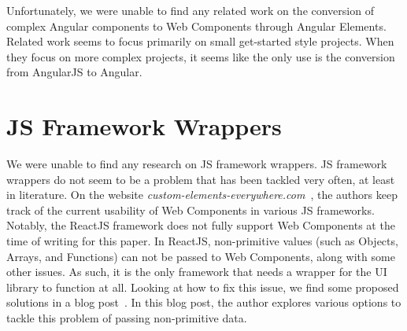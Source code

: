 Unfortunately, we were unable to find any related work on the conversion of complex Angular components to Web Components through Angular Elements. Related work seems to focus primarily on small get-started style projects. When they focus on more complex projects, it seems like the only use is the conversion from AngularJS to Angular.

\section{JS Framework Wrappers}
We were unable to find any research on JS framework wrappers. JS framework wrappers do not seem to be a problem that has been tackled very often, at least in literature. On the website \emph{custom-elements-everywhere.com}~, the authors keep track of the current usability of Web Components in various JS frameworks. Notably, the ReactJS framework does not fully support Web Components at the time of writing for this paper. In ReactJS, non-primitive values (such as Objects, Arrays, and Functions) can not be passed to Web Components, along with some other issues. As such, it is the only framework that needs a wrapper for the UI library to function at all. Looking at how to fix this issue, we find some proposed solutions in a blog post~. In this blog post, the author explores various options to tackle this problem of passing non-primitive data.
